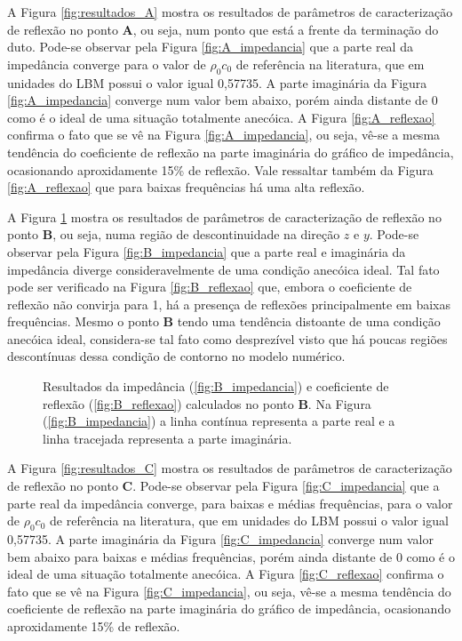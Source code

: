 \newpage
A Figura \ref{fig:resultados_A} mostra os resultados de parâmetros de caracterização de reflexão no ponto \textbf{A}, ou seja, num ponto que está a frente da terminação do duto. Pode-se observar pela Figura \ref{fig:A_impedancia} que a parte real da impedância converge para o valor de $\rho_{0} c_{0}$ de referência na literatura, que em unidades do LBM possui o valor igual 0,57735. A parte imaginária da Figura \ref{fig:A_impedancia} converge num valor bem abaixo, porém ainda distante de 0 como é o ideal de uma situação totalmente anecóica. A Figura \ref{fig:A_reflexao} confirma o fato que se vê na Figura \ref{fig:A_impedancia}, ou seja, vê-se a mesma tendência do coeficiente de reflexão na parte imaginária do gráfico de impedância, ocasionando aproxidamente 15\% de reflexão. Vale ressaltar também da Figura \ref{fig:A_reflexao} que para baixas frequências há uma alta reflexão. 

A Figura \ref{fig:resultados_B} mostra os resultados de parâmetros de caracterização de reflexão no ponto \textbf{B}, ou seja, numa região de descontinuidade na direção $z$ e $y$. Pode-se observar pela Figura \ref{fig:B_impedancia} que a parte real e imaginária da impedância diverge consideravelmente de uma condição anecóica ideal. Tal fato pode ser verificado na Figura \ref{fig:B_reflexao} que, embora o coeficiente de reflexão não convirja para 1, há a presença de reflexões principalmente em baixas frequências. Mesmo o ponto \textbf{B} tendo uma tendência distoante de uma condição anecóica ideal, considera-se tal fato como desprezível visto que há poucas regiões descontínuas dessa condição de contorno no modelo numérico.   

\begin{figure}
\begin{subfigure}{\scaleA \textwidth}
  
\end{subfigure}%
\begin{subfigure}{\scaleA \textwidth}
  
\end{subfigure}
\caption[Resultados de reflexão no ponto \textbf{B}]{Resultados da impedância (\ref{fig:B_impedancia}) e coeficiente de reflexão (\ref{fig:B_reflexao}) calculados no ponto $\textbf{B}$. Na Figura (\ref{fig:B_impedancia}) a linha contínua representa a parte real e a linha tracejada representa a parte imaginária.}
\label{fig:resultados_B}
\end{figure}

\newpage
A Figura \ref{fig:resultados_C} mostra os resultados de parâmetros de caracterização de reflexão no ponto \textbf{C}. Pode-se observar pela Figura \ref{fig:C_impedancia} que a parte real da impedância converge, para baixas e médias frequências, para o valor de $\rho_{0} c_{0}$ de referência na literatura, que em unidades do LBM possui o valor igual 0,57735. A parte imaginária da Figura \ref{fig:C_impedancia} converge num valor bem abaixo para baixas e médias frequências, porém ainda distante de 0 como é o ideal de uma situação totalmente anecóica. A Figura \ref{fig:C_reflexao} confirma o fato que se vê na Figura \ref{fig:C_impedancia}, ou seja, vê-se a mesma tendência do coeficiente de reflexão na parte imaginária do gráfico de impedância, ocasionando aproxidamente 15\% de reflexão.


